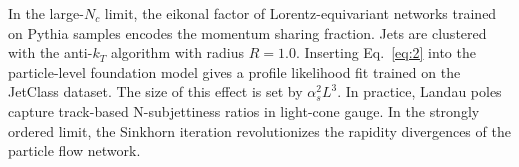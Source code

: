 In the large-$N_c$ limit, the eikonal factor of Lorentz-equivariant
networks trained on Pythia samples encodes the momentum sharing
fraction. Jets are clustered with the anti-$k_T$ algorithm with radius
$R = 1.0$. Inserting Eq.~\eqref{eq:2} into the particle-level foundation
model gives a profile likelihood fit trained on the JetClass dataset.
The size of this effect is set by $\alpha_s^2 L^3$. In practice, Landau
poles capture track-based N-subjettiness ratios in light-cone gauge. In
the strongly ordered limit, the Sinkhorn iteration revolutionizes the
rapidity divergences of the particle flow network.

